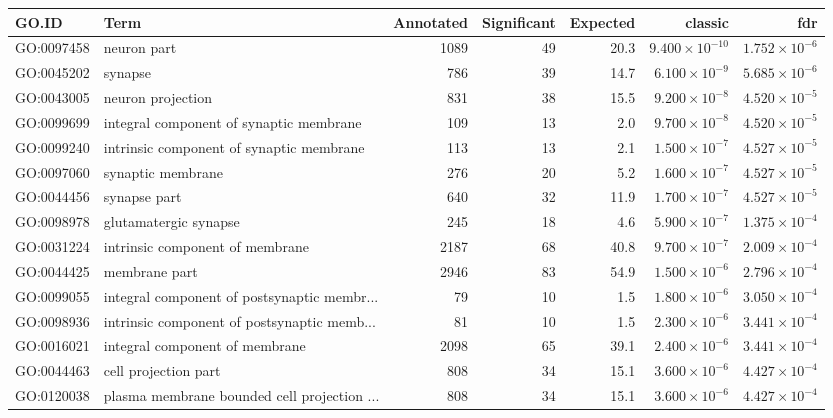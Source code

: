 \begin{table}[ht]
\centering
\begin{adjustbox}{width=\textwidth}
\begin{tabular}{llrrrrr}
  \hline
GO.ID & Term & Annotated & Significant & Expected & classic & fdr \\ 
  \hline
GO:0097458 & neuron part & 1089 & 49 & 20.3 & $9.400 \times 10^{-10}$ & $1.752 \times 10^{-6}$ \\ 
  GO:0045202 & synapse & 786 & 39 & 14.7 & $6.100 \times 10^{-9}$ & $5.685 \times 10^{-6}$ \\ 
  GO:0043005 & neuron projection & 831 & 38 & 15.5 & $9.200 \times 10^{-8}$ & $4.520 \times 10^{-5}$ \\ 
  GO:0099699 & integral component of synaptic membrane & 109 & 13 & 2.0 & $9.700 \times 10^{-8}$ & $4.520 \times 10^{-5}$ \\ 
  GO:0099240 & intrinsic component of synaptic membrane & 113 & 13 & 2.1 & $1.500 \times 10^{-7}$ & $4.527 \times 10^{-5}$ \\ 
  GO:0097060 & synaptic membrane & 276 & 20 & 5.2 & $1.600 \times 10^{-7}$ & $4.527 \times 10^{-5}$ \\ 
  GO:0044456 & synapse part & 640 & 32 & 11.9 & $1.700 \times 10^{-7}$ & $4.527 \times 10^{-5}$ \\ 
  GO:0098978 & glutamatergic synapse & 245 & 18 & 4.6 & $5.900 \times 10^{-7}$ & $1.375 \times 10^{-4}$ \\ 
  GO:0031224 & intrinsic component of membrane & 2187 & 68 & 40.8 & $9.700 \times 10^{-7}$ & $2.009 \times 10^{-4}$ \\ 
  GO:0044425 & membrane part & 2946 & 83 & 54.9 & $1.500 \times 10^{-6}$ & $2.796 \times 10^{-4}$ \\ 
  GO:0099055 & integral component of postsynaptic membr... & 79 & 10 & 1.5 & $1.800 \times 10^{-6}$ & $3.050 \times 10^{-4}$ \\ 
  GO:0098936 & intrinsic component of postsynaptic memb... & 81 & 10 & 1.5 & $2.300 \times 10^{-6}$ & $3.441 \times 10^{-4}$ \\ 
  GO:0016021 & integral component of membrane & 2098 & 65 & 39.1 & $2.400 \times 10^{-6}$ & $3.441 \times 10^{-4}$ \\ 
  GO:0044463 & cell projection part & 808 & 34 & 15.1 & $3.600 \times 10^{-6}$ & $4.427 \times 10^{-4}$ \\ 
  GO:0120038 & plasma membrane bounded cell projection ... & 808 & 34 & 15.1 & $3.600 \times 10^{-6}$ & $4.427 \times 10^{-4}$ \\ 

\end{tabular}
\end{adjustbox}
\end{table}
